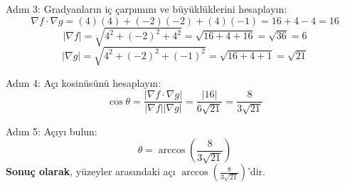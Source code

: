 \documentclass[11pt,letterpaper,twocolumn]{fenbil}
\begin{document}
Adım 3: Gradyanların iç çarpımını ve büyüklüklerini hesaplayın:
\[
\nabla f \cdot \nabla g = (4)(4) + (-2)(-2) + (4)(-1) = 16 + 4 - 4 = 16
\]
\[
|\nabla f| = \sqrt{4^2 + (-2)^2 + 4^2} = \sqrt{16 + 4 + 16} = \sqrt{36} = 6
\]
\[
|\nabla g| = \sqrt{4^2 + (-2)^2 + (-1)^2} = \sqrt{16 + 4 + 1} = \sqrt{21}
\]

Adım 4: Açı kosinüsünü hesaplayın:
\[
\cos{\theta} = \frac{|\nabla f \cdot \nabla g|}{|\nabla f| |\nabla g|} = \frac{|16|}{6 \sqrt{21}} = \frac{8}{3\sqrt{21}}
\]

Adım 5: Açıyı bulun:
\[
\theta = \arccos{\left(\frac{8}{3\sqrt{21}}\right)}
\]
\textbf{Sonuç olarak}, yüzeyler arasındaki açı $\arccos{\left(\frac{8}{3\sqrt{21}}\right)}$'dir.
\end{document}
